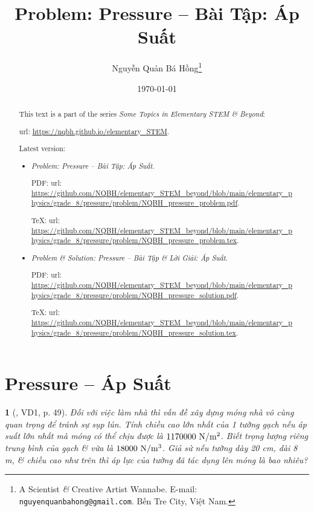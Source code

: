 \documentclass{article}
\title{Problem: Pressure -- Bài Tập: Áp Suất}
\author{Nguyễn Quản Bá Hồng\footnote{A Scientist {\it\&} Creative Artist Wannabe. E-mail: {\tt nguyenquanbahong@gmail.com}. Bến Tre City, Việt Nam.}}
\date{\today}
\newtheorem{baitoan}{}
\begin{document}
\maketitle
\begin{abstract}
	This text is a part of the series {\it Some Topics in Elementary STEM \& Beyond}:
	
	{\sc url}: \url{https://nqbh.github.io/elementary_STEM}.
	
	Latest version:
	\begin{itemize}
		\item {\it Problem: Pressure -- Bài Tập: Áp Suất}.
		
		PDF: {\sc url}: \url{https://github.com/NQBH/elementary_STEM_beyond/blob/main/elementary_physics/grade_8/pressure/problem/NQBH_pressure_problem.pdf}.
		
		\TeX: {\sc url}: \url{https://github.com/NQBH/elementary_STEM_beyond/blob/main/elementary_physics/grade_8/pressure/problem/NQBH_pressure_problem.tex}.
		\item {\it Problem \& Solution: Pressure -- Bài Tập \& Lời Giải: Áp Suất}.
		
		PDF: {\sc url}: \url{https://github.com/NQBH/elementary_STEM_beyond/blob/main/elementary_physics/grade_8/pressure/problem/NQBH_pressure_solution.pdf}.
		
		\TeX: {\sc url}: \url{https://github.com/NQBH/elementary_STEM_beyond/blob/main/elementary_physics/grade_8/pressure/problem/NQBH_pressure_solution.tex}.
	\end{itemize}
\end{abstract}
\tableofcontents


\section{Pressure -- Áp Suất}

\begin{baitoan}[\cite{Van_Quyen_Hanh_Nhu_10_chuyen_Ly}, VD1, p. 49]
	Đối với việc làm nhà thì vấn đề xây dựng móng nhà vô cùng quan trọng để tránh sự sụp lún. Tính chiều cao lớn nhất của 1 tường gạch nếu áp suất lớn nhất mà móng có thể chịu được là $\rm1170000\ N{\tt/}m^2$. Biết trọng lượng riêng trung bình của gạch \& vữa là $\rm18000\ N{\tt/}m^3$. Giả sử nếu tường dày {\rm20 cm}, dài {\rm8 m}, \& chiều cao như trên thì áp lực của tường đã tác dụng lên móng là bao nhiêu?
\end{baitoan}
\end{document}
